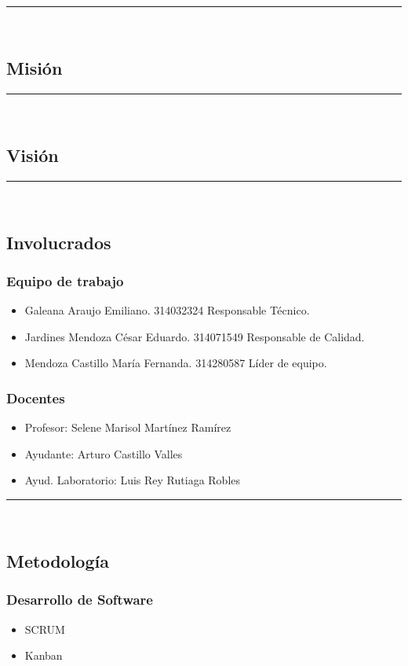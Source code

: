 \documentclass{article}
\begin{document}
\rule{0.8\textwidth}{.8pt}\\

\subsection*{Misión}

\rule{0.8\textwidth}{.8pt}\\

\subsection*{Visión}

\rule{0.8\textwidth}{.8pt}\\

\subsection*{Involucrados}
\subsubsection*{Equipo de trabajo}
\begin{itemize}
\item Galeana Araujo Emiliano. 314032324 Responsable Técnico.
\item Jardines Mendoza César Eduardo. 314071549 Responsable de Calidad.
\item Mendoza Castillo María Fernanda. 314280587 Líder de equipo.
\end{itemize}

\subsubsection*{Docentes}
\begin{itemize}
\item Profesor: Selene Marisol Martínez Ramírez
\item Ayudante: Arturo Castillo Valles
\item Ayud. Laboratorio: Luis Rey Rutiaga Robles
\end{itemize}

\rule{0.8\textwidth}{.8pt}\\

\subsection*{Metodología}
\subsubsection*{Desarrollo de Software}
\begin{itemize}
\item SCRUM
\item Kanban
\end{itemize}
\end{document}
